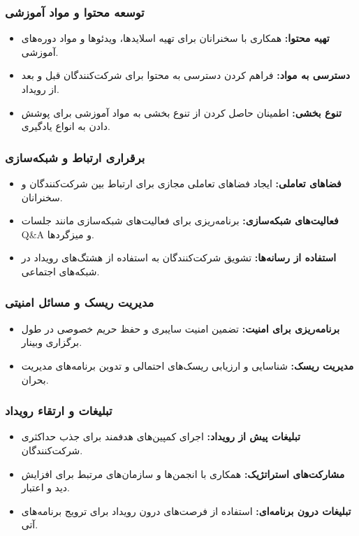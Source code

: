 \subsubsection*{توسعه محتوا و مواد آموزشی}
\begin{itemize}
	\item \textbf{تهیه محتوا:} همکاری با سخنرانان برای تهیه اسلایدها، ویدئوها و مواد دوره‌های آموزشی.
	\item \textbf{دسترسی به مواد:} فراهم کردن دسترسی به محتوا برای شرکت‌کنندگان قبل و بعد از رویداد.
	\item \textbf{تنوع بخشی:} اطمینان حاصل کردن از تنوع بخشی به مواد آموزشی برای پوشش دادن به انواع یادگیری.
\end{itemize}

\subsubsection*{برقراری ارتباط و شبکه‌سازی}
\begin{itemize}
	\item \textbf{فضاهای تعاملی:} ایجاد فضاهای تعاملی مجازی برای ارتباط بین شرکت‌کنندگان و سخنرانان.
	\item \textbf{فعالیت‌های شبکه‌سازی:} برنامه‌ریزی برای فعالیت‌های شبکه‌سازی مانند جلسات Q\&A و میزگردها.
	\item \textbf{استفاده از رسانه‌ها:} تشویق شرکت‌کنندگان به استفاده از هشتگ‌های رویداد در شبکه‌های اجتماعی.
\end{itemize}

\subsubsection*{مدیریت ریسک و مسائل امنیتی}
\begin{itemize}
	\item \textbf{برنامه‌ریزی برای امنیت:} تضمین امنیت سایبری و حفظ حریم خصوصی در طول برگزاری وبینار.
	\item \textbf{مدیریت ریسک:} شناسایی و ارزیابی ریسک‌های احتمالی و تدوین برنامه‌های مدیریت بحران.
\end{itemize}

\subsubsection*{تبلیغات و ارتقاء رویداد}
\begin{itemize}
	\item \textbf{تبلیغات پیش از رویداد:} اجرای کمپین‌های هدفمند برای جذب حداکثری شرکت‌کنندگان.
	\item \textbf{مشارکت‌های استراتژیک:} همکاری با انجمن‌ها و سازمان‌های مرتبط برای افزایش دید و اعتبار.
	\item \textbf{تبلیغات درون برنامه‌ای:} استفاده از فرصت‌های درون رویداد برای ترویج برنامه‌های آتی.
\end{itemize}

